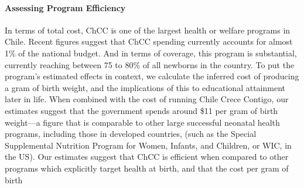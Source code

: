 \documentclass[12pt]{article}
\begin{document}
\begin{spacing}{1.4}

\paragraph{Assessing Program Efficiency}
In terms of total cost, ChCC is one of the largest health or welfare
programs in Chile.  Recent figures suggest that ChCC spending currently
accounts for almost 1\% of the national budget. And in terms of coverage,
this program is substantial, currently reaching between 75 to 80\% of all
newborns in the country.
To put the program's estimated effects in context, we calculate the inferred cost
of producing a gram of birth weight, and the implications of this to
educational attainment later in life.  When combined with the cost of
running Chile Crece Contigo, our estimates suggest that the government
spends around \$11 per gram of birth weight---a figure that is comparable
to other large successful neonatal health programs, including those in
developed countries, (such as the Special Supplemental Nutrition Program
for Women, Infants, and Children, or WIC, in the US).  Our estimates
suggest that ChCC is efficient when compared to other programs which
explicitly target health at birth, and that the cost per gram of birth

\end{spacing}
\end{document}
